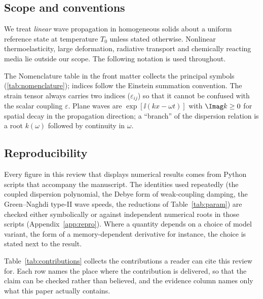 \subsection{Scope and conventions}\label{sec:conventions}
We treat \emph{linear} wave propagation in homogeneous solids about a uniform reference state at temperature $T_0$ unless stated otherwise. Nonlinear thermoelasticity, large deformation, radiative transport and chemically reacting media lie outside our scope. The following notation is used throughout.

The Nomenclature table in the front matter collects the principal symbols (\cref{tab:nomenclature}); indices follow the Einstein summation convention.
The strain tensor always carries two indices ($\varepsilon_{ij}$) so that it cannot be confused with the scalar coupling $\varepsilon$. Plane waves are $\exp[\ii(kx-\omega t)]$ with $\Imag k\ge0$ for spatial decay in the propagation direction; a ``branch'' of the dispersion relation is a root $k(\omega)$ followed by continuity in $\omega$.

\subsection{Reproducibility}
Every figure in this review that displays numerical results comes from Python scripts that accompany the manuscript. The identities used repeatedly (the coupled dispersion polynomial, the Debye form of weak-coupling damping, the Green--Naghdi type-II wave speeds, the reductions of Table~\ref{tab:param}) are checked either symbolically or against independent numerical roots in those scripts (Appendix~\ref{app:repro}). Where a quantity depends on a choice of model variant, the form of a memory-dependent derivative for instance, the choice is stated next to the result.

Table~\cref{tab:contributions} collects the contributions a reader can cite this review for. Each row names the place where the contribution is delivered, so that the claim can be checked rather than believed, and the evidence column names only what this paper actually contains.


